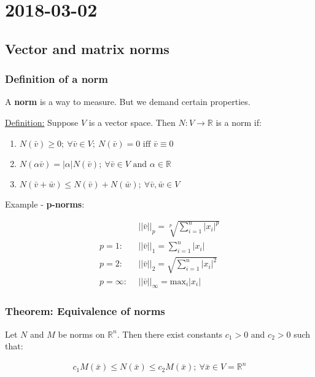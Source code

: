 \section{2018-03-02}

\subsection{Vector and matrix norms}

\subsubsection{Definition of a norm}

A \textbf{norm} is a way to measure. But we demand certain properties.

\underline{Definition:} Suppose $V$ is a vector space. Then $N: V \rightarrow \mathbb{R}$ is a norm if:

\begin{enumerate}
  \item $N(\bar{v}) \geq 0;\ \forall \bar{v} \in V;\ N(\bar{v}) = 0 \text{ iff } \bar{v} \equiv 0$
  \item $N(\alpha \bar{v}) = |\alpha| N(\bar{v});\ \forall \bar{v} \in V \text{ and } \alpha \in \mathbb{R}$
  \item $N(\bar{v}+\bar{w}) \leq N(\bar{v}) + N(\bar{w});\ \forall \bar{v}, \bar{w} \in V$
\end{enumerate}

Example - \textbf{p-norms}:

\begin{align*}
                  &||\bar{v}||_p      = \sqrt[p]{\sum_{i=1}^{n} |x_i|^p} \\
  p = 1:\ \       &||\bar{v}||_1      = \sum_{i=1}^{n} |x_i| \\
  p = 2:\ \       &||\bar{v}||_2      = \sqrt{\sum_{i=1}^{n} |x_i|^2} \\
  p = \infty:\ \  &||\bar{v}||_\infty = \text{max}_i |x_i|
\end{align*}

\subsubsection{Theorem: Equivalence of norms}

Let $N$ and $M$ be norms on $\mathbb{R}^n$. Then there exist constants $c_1 > 0$ and $c_2 > 0$ such that:

\begin{align*}
  c_1 M(\bar{x}) \leq N(\bar{x}) \leq c_2 M(\bar{x});\ \forall \bar{x} \in V = \mathbb{R}^n
\end{align*}

